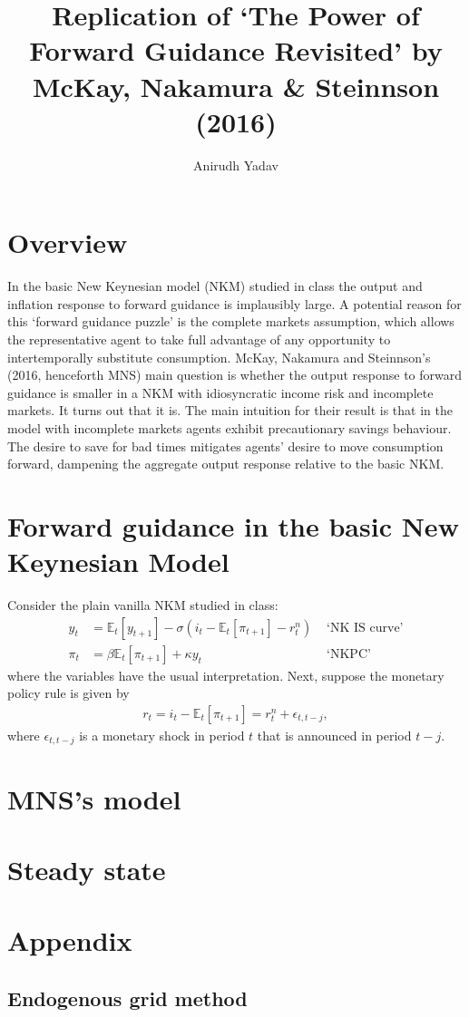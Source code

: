 \documentclass[12pt]{article}
\title{Replication of `The Power of Forward Guidance Revisited' by McKay, Nakamura \& Steinnson (2016)}
\author{Anirudh Yadav}
\newcommand{\E}{\mathbb{E}}
\newcommand{\e}{\epsilon}
\begin{document}
\maketitle

\setcounter{tocdepth}{2}
\tableofcontents

\newpage

\section{Overview}
In the basic New Keynesian model (NKM) studied in class the output and inflation response to forward guidance is implausibly large. A potential reason for this `forward guidance puzzle' is the complete markets assumption, which allows the representative agent to take full advantage of any opportunity to intertemporally substitute consumption. McKay, Nakamura and Steinnson's (2016, henceforth MNS) main question is whether the output response to forward guidance is smaller in a NKM with idiosyncratic income risk and incomplete markets. It turns out that it is. The main intuition for their result is that in the model with incomplete markets agents exhibit precautionary savings behaviour. The desire to save for bad times mitigates agents' desire to move consumption forward, dampening the aggregate output response relative to the basic NKM.

\section{Forward guidance in the basic New Keynesian Model}
Consider the plain vanilla NKM studied in class:
\begin{align*}
y_t &= \E_t[y_{t+1}] - \sigma(i_t - \E_t[\pi_{t+1}] - r_t^n) &\text{ `NK IS curve'}\\
\pi_t  &= \beta\E_t[\pi_{t+1}]  + \kappa y_t &\text{ `NKPC'}
\end{align*}
where the variables have the usual interpretation. Next, suppose the monetary policy rule is given by
\begin{align*}
r_t = i_t - \E_t[\pi_{t+1}] = r_t^n + \e_{t,t-j},
\end{align*}
where $\e_{t,t-j}$ is a monetary shock in period $t$ that is announced in period $t-j$.

\section{MNS's model}

\section{Steady state}

\section{Appendix}
\subsection{Endogenous grid method}
\end{document}
